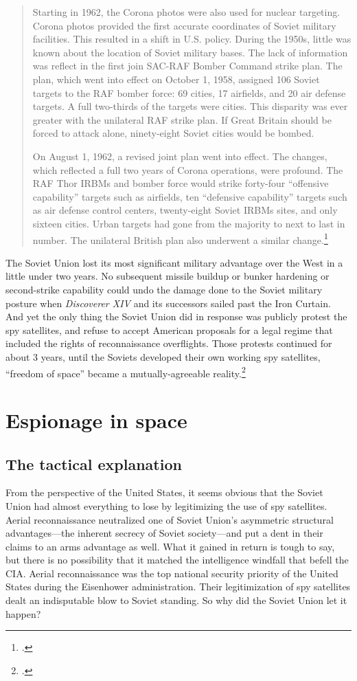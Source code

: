 \documentclass[11pt]{memoir}
\begin{document}
\begin{quote}
Starting in 1962, the Corona photos were also used for nuclear targeting. Corona photos provided the first accurate coordinates of Soviet military facilities. This resulted in a shift in U.S. policy. During the 1950s, little was known about the location of Soviet military bases. The lack of information was reflect in the first join SAC-RAF Bomber Command strike plan. The plan, which went into effect on October 1, 1958, assigned 106 Soviet targets to the RAF bomber force: 69 cities, 17 airfields, and 20 air defense targets. A full two-thirds of the targets were cities. This disparity was ever greater with the unilateral RAF strike plan. If Great Britain should be forced to attack alone, ninety-eight Soviet cities would be bombed.

On August 1, 1962, a revised joint plan went into effect. The changes, which reflected a full two years of Corona operations, were profound. The RAF Thor IRBMs and bomber force would strike forty-four ``offensive capability'' targets such as airfields, ten ``defensive capability'' targets such as air defense control centers, twenty-eight Soviet IRBMs sites, and only sixteen cities. Urban targets had gone from the majority to next to last in number. The unilateral British plan also underwent a similar change.\footcite[p.~139]{peebles_corona_1997}
\end{quote}
The Soviet Union lost its most significant military advantage over the West in a little under two years. No subsequent missile buildup or bunker hardening or second-strike capability could undo the damage done to the Soviet military posture when \emph{Discoverer XIV} and its successors sailed past the Iron Curtain. And yet the only thing the Soviet Union did in response was publicly protest the spy satellites, and refuse to accept American proposals for a legal regime that included the rights of reconnaissance overflights. Those protests continued for about 3 years, until the Soviets developed their own working spy satellites, ``freedom of space'' became a mutually-agreeable reality.\footcite[p.~271-275]{mcdougall_heavens_1985}

\section{Espionage in space}
\subsection{The tactical explanation}
From the perspective of the United States, it seems obvious that the Soviet Union had almost everything to lose by legitimizing the use of spy satellites. Aerial reconnaissance neutralized one of Soviet Union's asymmetric structural advantages---the inherent secrecy of Soviet society---and put a dent in their claims to an arms advantage as well. What it gained in return is tough to say, but there is no possibility that it matched the intelligence windfall that befell the CIA. Aerial reconnaissance was the top national security priority of the United States during the Eisenhower administration. Their legitimization of spy satellites dealt an indisputable blow to Soviet standing. So why did the Soviet Union let it happen?
\end{document}
